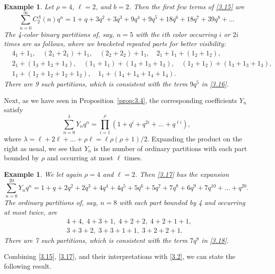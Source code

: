 \documentclass{amsart}
\theoremstyle{plain}
\newtheorem{example}[theorem]{Example}
\numberwithin{equation}{section}
\begin{document}
\begin{example}\label{ex:3.11}
{\rm Let $\rho=4$, $\ell=2$, and $b=2$. Then the first few terms of 
\eqref{3.15} are}
\begin{equation}\label{3.16}
\sum_{n=0}^\infty C_2^\Lambda(n)q^n 
=1+q+3q^2+3q^3+9q^4+9q^5+18q^6+18q^7+39q^8+\dots
\end{equation}
{\rm The 4-color binary partitions of, say, $n=5$ with the $i$th color occurring
$i$ or $2i$ times are as follows, where we bracketed repeated parts for better
visibility:}
\begin{align*}
& 4_1+1_1,\quad (2_1+2_1)+1_1,\quad (2_2+2_2)+1_1,\quad 2_1+1_1+(1_2+1_2),\\
& 2_1+(1_3+1_3+1_3),\quad (1_1+1_1)+(1_3+1_3+1_3),\quad (1_2+1_2)+(1_3+1_3+1_3),\\
& 1_1+(1_2+1_2+1_2+1_2),\quad 1_1+(1_4+1_4+1_4+1_4).
\end{align*}
{\rm There are 9 such partitions, which is consistent with the term $9q^5$
in \eqref{3.16}.}
\end{example}

Next, as we have seen in Proposition~\ref{prop:3.4}, the
corresponding coefficients $Y_n$ satisfy
\begin{equation}\label{3.17}
\sum_{n=0}^\lambda Y_nq^n = \prod_{i=1}^\rho
\left(1+q^i+q^{2i}+\dots+q^{\ell i}\right),
\end{equation}
where $\lambda=\ell+2\ell+\dots+\rho\ell=\ell\rho(\rho+1)/2$. Expanding the
product on the right as usual, we see that $Y_n$ is the number of ordinary
partitions with each part bounded by $\rho$ and occurring at most $\ell$ times.

\begin{example}\label{ex:3.12}
{\rm We let again $\rho=4$ and $\ell=2$. Then \eqref{3.17} has the expansion}
\begin{equation}\label{3.18}
\sum_{n=0}^{20} Y_nq^n 
= 1+q+2q^2+2q^3+4q^4+4q^5+5q^6+5q^7+7q^8+6q^9+7q^{10}+\dots+q^{20}.
\end{equation}
{\rm The ordinary partitions of, say, $n=8$ with each part bounded by 4 and 
occurring at most twice, are}
\begin{align*}
& 4+4,\; 4+3+1,\; 4+2+2,\; 4+2+1+1,\\
& 3+3+2,\; 3+3+1+1,\; 3+2+2+1.
\end{align*}
{\rm There are 7 such partitions, which is consistent with the term $7q^8$ in
\eqref{3.18}.}
\end{example}

Combining \eqref{3.15}, \eqref{3.17}, and their interpretations with 
\eqref{3.2}, we can state the following result.
\end{document}
